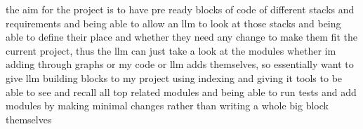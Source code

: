  the aim for the project is to have pre ready blocks of code of different stacks and requirements and being able to allow an llm to look at those stacks and being able to define their place and whether they need any change to make them fit the current project, thus the llm can just take a look at the modules whether im adding through graphs or my code or llm adds themselves, so essentially want to give llm building blocks to my project using indexing and giving it tools to be able to see and recall all top related modules and being able to run tests and add modules by making minimal changes rather than writing a whole big block themselves
